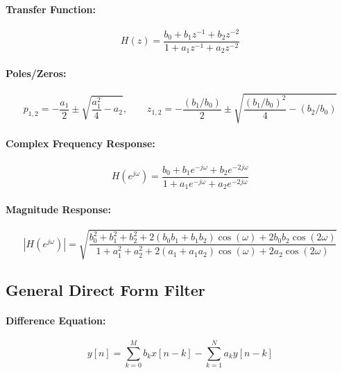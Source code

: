 \paragraph{Transfer Function:}
\begin{equation}
 H(z) = \frac{b_0 + b_1 z^{-1} + b_2 z^{-2}} {1 + a_1 z^{-1} + a_2 z^{-2}}
\end{equation}

\paragraph{Poles/Zeros:}
\begin{equation}
 p_{1,2} = -\frac{a_1}{2}       \pm \sqrt{\frac{a_1^2}{4} - a_2}, \qquad
 z_{1,2} = -\frac{(b_1/b_0)}{2} \pm \sqrt{\frac{(b_1/b_0)^2}{4} - (b_2/b_0)}
\end{equation}

\paragraph{Complex Frequency Response:}
\begin{equation}
 H(e^{j \omega}) = \frac{b_0 + b_1 e^{-j \omega} + b_2 e^{-2j \omega} }{1 + a_1 e^{-j \omega} + a_2 e^{-2j \omega}}
\end{equation}

\paragraph{Magnitude Response:}
\begin{equation}
 |H(e^{j \omega})| 
 = \sqrt{\frac{b_0^2 + b_1^2 + b_2^2 + 2 (b_0 b_1 + b_1 b_2) \cos (\omega) + 2 b_0 b_2 \cos(2 \omega) }
              {1     + a_1^2 + a_2^2 + 2 (    a_1 + a_1 a_2) \cos (\omega) + 2    a_2 \cos(2 \omega) } }
\end{equation}

\newpage

\subsection{General Direct Form Filter}

\paragraph{Difference Equation:}
\begin{equation}
 y[n] = \sum_{k=0}^M  b_k x[n-k] - \sum_{k=1}^N a_k y[n-k]
\end{equation}

